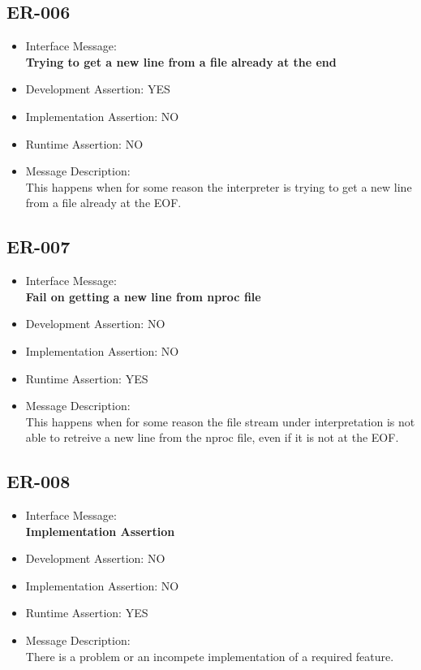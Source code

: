 \subsection{ER-006}
\begin{itemize}
  \item Interface Message:\\[1em]
    \textbf{Trying to get a new line from a file already at the end}
  \item Development Assertion: YES
  \item Implementation Assertion: NO
  \item Runtime Assertion: NO
  \item Message Description:\\[1em]
    This happens when for some reason the interpreter is trying to get a new line from a file already at the EOF.
\end{itemize}

\subsection{ER-007}
\begin{itemize}
  \item Interface Message:\\[1em]
    \textbf{Fail on getting a new line from nproc file}
  \item Development Assertion: NO
  \item Implementation Assertion: NO
  \item Runtime Assertion: YES
  \item Message Description:\\[1em]
    This happens when for some reason the file stream under interpretation is not able to retreive a new line from the nproc file, even if it is not at the EOF.
\end{itemize}

\subsection{ER-008}
\begin{itemize}
  \item Interface Message:\\[1em]
    \textbf{Implementation Assertion}
  \item Development Assertion: NO
  \item Implementation Assertion: NO
  \item Runtime Assertion: YES
  \item Message Description:\\[1em]
    There is a problem or an incompete implementation of a required feature.
\end{itemize}

